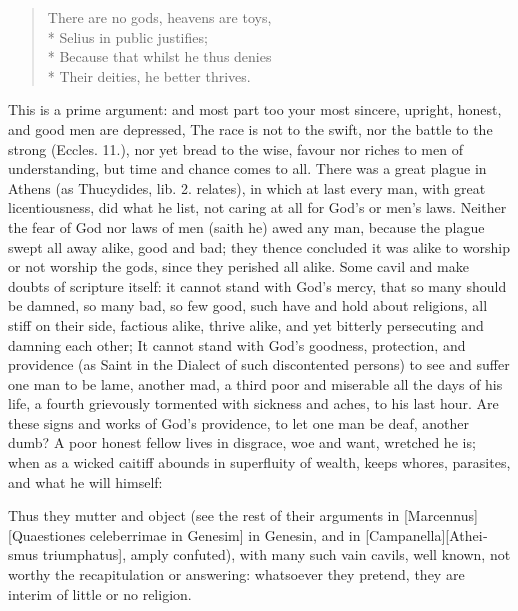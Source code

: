 {\begin{verse}
There are no gods, heavens are toys,\\*
Selius in public justifies;\\*
Because that whilst he thus denies\\*
Their deities, he better thrives.
\end{verse}

This is a prime argument: and most part too your most sincere, upright,
honest, and good men are depressed, The race is not to the swift,
nor the battle to the strong (Eccles.  11.), nor yet bread to the
wise, favour nor riches to men of understanding, but time and chance
comes to all. There was a great plague in Athens (as Thucydides, lib.
2. relates), in which at last every man, with great licentiousness, did
what he list, not caring at all for God's or men's laws. Neither the
fear of God nor laws of men (saith he) awed any man, because the plague
swept all away alike, good and bad; they thence concluded it was alike
to worship or not worship the gods, since they perished all alike. Some
cavil and make doubts of scripture itself: it cannot stand with God's
mercy, that so many should be damned, so many bad, so few good, such
have and hold about religions, all stiff on their side, factious alike,
thrive alike, and yet bitterly persecuting and damning each other; It
cannot stand with God's goodness, protection, and providence (as
Saint \Chrysostom{} in the Dialect of such discontented persons) to
see and suffer one man to be lame, another mad, a third poor and
miserable all the days of his life, a fourth grievously tormented with
sickness and aches, to his last hour. Are these signs and works of
God's providence, to let one man be deaf, another dumb? A poor honest
fellow lives in disgrace, woe and want, wretched he is; when as a
wicked caitiff abounds in superfluity of wealth, keeps whores,
parasites, and what he will himself:


Thus they mutter and object (see the rest of their
arguments in [Marcennus][\textlatin{Quaestiones celeberrimae in Genesim}] in Genesin, and in [Campanella][\textlatin{Atheismus triumphatus}], amply confuted),
with many such vain cavils, well known, not worthy the recapitulation
or answering: whatsoever they pretend, they are interim of little or no
religion.

}

